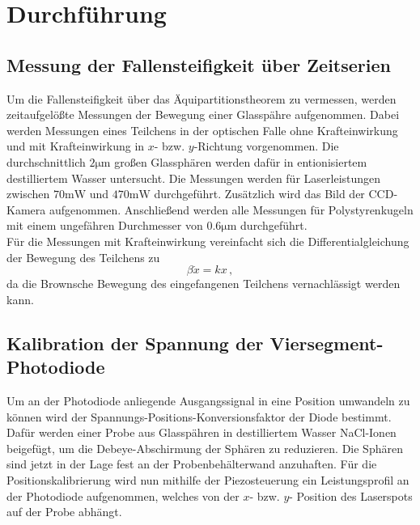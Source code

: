 \section{Durchführung}
\subsection{Messung der Fallensteifigkeit über Zeitserien}
Um die Fallensteifigkeit über das Äquipartitionstheorem zu vermessen, werden zeitaufgelößte Messungen der Bewegung einer Glasspähre aufgenommen. Dabei werden Messungen eines Teilchens in der optischen Falle ohne Krafteinwirkung und mit Krafteinwirkung in $x$- bzw. $y$-Richtung vorgenommen. Die durchschnittlich $2 \si{\micro\meter}$ großen Glassphären werden dafür in entionisiertem destilliertem Wasser untersucht. Die Messungen werden für Laserleistungen zwischen $70\si{\milli\watt}$ und $470\si{\milli\watt}$ durchgeführt. Zusätzlich wird das Bild der CCD-Kamera aufgenommen. Anschließend werden alle Messungen für Polystyrenkugeln mit einem ungefähren Durchmesser von $0.6\si{\micro\meter}$ durchgeführt.\\
Für die Messungen mit Krafteinwirkung vereinfacht sich die Differentialgleichung der Bewegung des Teilchens zu
\begin{equation}
  \beta \dot x = kx \, ,
\end{equation}
da die Brownsche Bewegung des eingefangenen Teilchens vernachlässigt werden kann.

\subsection{Kalibration der Spannung der Viersegment-Photodiode}
Um an der Photodiode anliegende Ausgangssignal in eine Position umwandeln zu können wird der Spannungs-Positions-Konversionsfaktor der Diode bestimmt. Dafür werden einer Probe aus Glasspähren in destilliertem Wasser NaCl-Ionen beigefügt, um die Debeye-Abschirmung der Sphären zu reduzieren. Die Sphären sind jetzt in der Lage fest an der Probenbehälterwand anzuhaften. Für die Positionskalibrierung wird nun mithilfe der Piezosteuerung ein Leistungsprofil an der Photodiode aufgenommen, welches von der $x$- bzw. $y$- Position des Laserspots auf der Probe abhängt.

